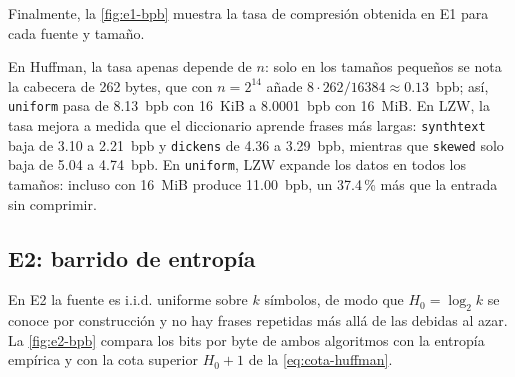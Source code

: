 Finalmente, la \cref{fig:e1-bpb} muestra la tasa de compresión obtenida en E1 para cada
fuente y tamaño.


En Huffman, la tasa apenas depende de $n$: solo en los tamaños pequeños se nota la cabecera de
262 bytes, que con $n = 2^{14}$ añade $8 \cdot 262 / 16384 \approx 0.13$~bpb; así,
\texttt{uniform} pasa de 8.13~bpb con 16~KiB a 8.0001~bpb con 16~MiB. En LZW, la tasa mejora a
medida que el diccionario aprende frases más largas: \texttt{synthtext} baja de 3.10 a
2.21~bpb y \texttt{dickens} de 4.36 a 3.29~bpb, mientras que \texttt{skewed} solo baja de 5.04 a
4.74~bpb. En \texttt{uniform}, LZW expande los datos en todos los tamaños: incluso con 16~MiB
produce 11.00~bpb, un 37.4\,\% más que la entrada sin comprimir.

\subsection{E2: barrido de entropía}
\label{sec:res-e2}
En E2 la fuente es i.i.d. uniforme sobre $k$ símbolos, de modo que $H_0 = \log_2 k$ se conoce
por construcción y no hay frases repetidas más allá de las debidas al azar. La
\cref{fig:e2-bpb} compara los bits por byte de ambos algoritmos con la entropía empírica y con
la cota superior $H_0 + 1$ de la \cref{eq:cota-huffman}.

